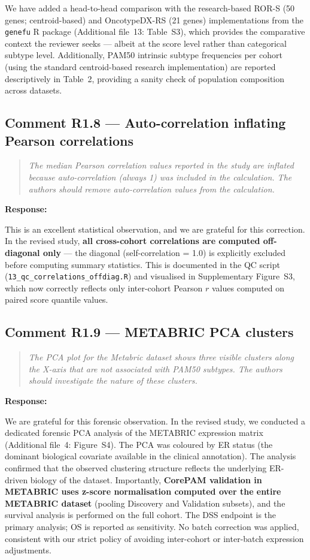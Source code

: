 \documentclass[11pt]{article}
\newcommand{\reviewerquote}[1]{\begin{quote}\itshape #1\end{quote}}
\begin{document}
We have added a head-to-head comparison with the research-based ROR-S (50 genes; centroid-based) and OncotypeDX-RS (21 genes) implementations from the \texttt{genefu} R package (Additional file~13: Table~S3), which provides the comparative context the reviewer seeks --- albeit at the score level rather than categorical subtype level. Additionally, PAM50 intrinsic subtype frequencies per cohort (using the standard centroid-based research implementation) are reported descriptively in Table~2, providing a sanity check of population composition across datasets.

\subsection*{Comment R1.8 --- Auto-correlation inflating Pearson correlations}

\reviewerquote{The median Pearson correlation values reported in the study are inflated because auto-correlation (always 1) was included in the calculation. The authors should remove auto-correlation values from the calculation.}

\noindent\textbf{Response:}

This is an excellent statistical observation, and we are grateful for this correction. In the revised study, \textbf{all cross-cohort correlations are computed off-diagonal only} --- the diagonal (self-correlation = 1.0) is explicitly excluded before computing summary statistics. This is documented in the QC script (\texttt{13\_qc\_correlations\_offdiag.R}) and visualised in Supplementary Figure~S3, which now correctly reflects only inter-cohort Pearson $r$ values computed on paired score quantile values.

\subsection*{Comment R1.9 --- METABRIC PCA clusters}

\reviewerquote{The PCA plot for the Metabric dataset shows three visible clusters along the X-axis that are not associated with PAM50 subtypes. The authors should investigate the nature of these clusters.}

\noindent\textbf{Response:}

We are grateful for this forensic observation. In the revised study, we conducted a dedicated forensic PCA analysis of the METABRIC expression matrix (Additional file~4: Figure~S4). The PCA was coloured by ER status (the dominant biological covariate available in the clinical annotation). The analysis confirmed that the observed clustering structure reflects the underlying ER-driven biology of the dataset. Importantly, \textbf{CorePAM validation in METABRIC uses z-score normalisation computed over the entire METABRIC dataset} (pooling Discovery and Validation subsets), and the survival analysis is performed on the full cohort. The DSS endpoint is the primary analysis; OS is reported as sensitivity. No batch correction was applied, consistent with our strict policy of avoiding inter-cohort or inter-batch expression adjustments.
\end{document}
